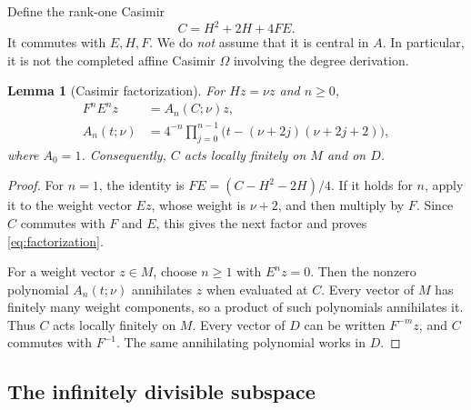 \documentclass[11pt,a4paper]{article}
\theoremstyle{plainupright}
\newtheorem{lemma}[theorem]{Lemma}
\begin{document}
Define the rank-one Casimir
\begin{equation}\label{eq:rank-one-C}
C=H^2+2H+4FE.
\end{equation}
It commutes with \(E,H,F\). We do \emph{not} assume that it is central
in \(A\). In particular, it is not the completed affine Casimir
\(\Omega\) involving the degree derivation.

\begin{lemma}[Casimir factorization]\label{lem:casimir}
For \(Hz=\nu z\) and \(n\ge0\),
\begin{equation}\label{eq:factorization}
\begin{aligned}
F^nE^nz&=A_n(C;\nu)z,\\
A_n(t;\nu)&=4^{-n}\prod_{j=0}^{n-1}
\bigl(t-(\nu+2j)(\nu+2j+2)\bigr),
\end{aligned}
\end{equation}
where \(A_0=1\). Consequently, \(C\) acts locally finitely on \(M\)
and on \(D\).
\end{lemma}
\begin{proof}
For \(n=1\), the identity is \(FE=(C-H^2-2H)/4\).
If it holds for \(n\), apply it to the weight vector \(Ez\), whose
weight is \(\nu+2\), and then multiply by \(F\). Since \(C\) commutes
with \(F\) and \(E\), this gives the next factor and proves
\eqref{eq:factorization}.

For a weight vector \(z\in M\), choose \(n\ge1\) with \(E^nz=0\).
Then the nonzero polynomial \(A_n(t;\nu)\) annihilates \(z\) when
evaluated at \(C\). Every vector of \(M\) has finitely many weight
components, so a product of such polynomials annihilates it.
Thus \(C\) acts locally finitely on \(M\).
Every vector of \(D\) can be written \(F^{-m}z\), and \(C\) commutes
with \(F^{-1}\). The same annihilating polynomial works in \(D\).
\end{proof}

\subsection{The infinitely divisible subspace}
\end{document}
